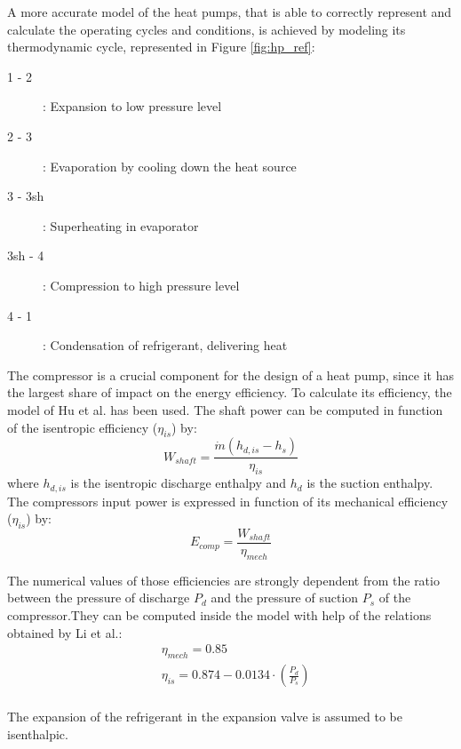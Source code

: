 \documentclass{article}
\begin{document}
A more accurate model of the heat pumps, that is able to correctly represent and calculate the operating cycles and conditions, is achieved by modeling its thermodynamic cycle\cite{demierreModelingExperimentalInvestigation2014}, represented in Figure \ref{fig:hp_ref}:

\begin{description}
	\item [1 - 2]: Expansion to low pressure level
	\item [2 - 3]: Evaporation by cooling down the heat source
	\item [3 - 3sh]: Superheating in evaporator
	\item [3sh - 4]: Compression to high pressure level
	\item [4 - 1]: Condensation of refrigerant, delivering heat
\end{description}

The compressor is a crucial component for the design of a heat pump, since it has the largest share of impact on the energy efficiency. To calculate its efficiency, the model of Hu et al.\cite{huExtremumSeekingControl2015} has been used. The shaft power can be computed in function of the isentropic efficiency ($\eta_{is}$) by:
\begin{equation}
W_{shaft} = \frac{\dot{m}(h_{d,is}-h_{s})}{\eta_{is}} 
\end{equation}
where $h_{d,is}$ is the isentropic discharge enthalpy and $h_{d}$ is the suction enthalpy. The compressors input power is expressed in function of its mechanical efficiency ($\eta_{is}$) by:
\begin{equation}
E_{comp} = \frac{W_{shaft}}{\eta_{mech}}  
\end{equation}

The numerical values of those efficiencies are strongly dependent from the ratio between the pressure of discharge $P_{d}$ and the pressure of suction $P_{s}$ of the compressor.They can be computed inside the model with help of the relations obtained by Li et al.\cite{liPerformanceCharacteristicsR1234yf2014}:
\begin{align}
& \eta_{mech} = 0.85\\
& \eta_{is} = 0.874-0.0134\cdot(\frac{P_{d}}{P_{s}})\\
\end{align}
		
The expansion of the refrigerant in the expansion valve is assumed to be isenthalpic.\\ 
\end{document}
